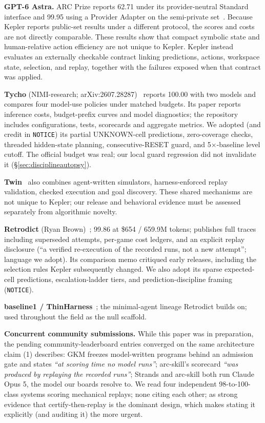 \documentclass[11pt]{article}
\begin{document}
\textbf{GPT-6 Astra.} ARC Prize reports 62.71 under its provider-neutral
Standard interface and 99.95 using a Provider Adapter on the semi-private
set~\citep{arcprize2026astra}. Because Kepler reports public-set results under a
different protocol, the scores and costs are not directly comparable. These
results show that compact symbolic state and human-relative action efficiency
are not unique to Kepler. Kepler instead evaluates an externally checkable
contract linking predictions, actions, workspace state, selection, and replay,
together with the failures exposed when that contract was applied.

\textbf{Tycho} (NIMI-research; arXiv:2607.28287)~\citep{tycho} reports 100.00 with two models and compares four model-use policies under matched budgets. Its paper reports inference costs, budget-prefix curves and model diagnostics; the repository includes configurations, tests, scorecards and aggregate metrics. We adopted (and credit in \texttt{NOTICE}) its partial UNKNOWN-cell predictions, zero-coverage checks, threaded hidden-state planning, consecutive-RESET guard, and 5$\times$-baseline level cutoff. The official budget was real; our local guard regression did not invalidate it (\S\ref{sec:disciplineautopsy}).

\textbf{Twin}~\citep{skoutnev2026twin} also combines agent-written simulators,
harness-enforced replay validation, checked execution and goal discovery.
These shared mechanisms are not unique to Kepler; our release and behavioral
evidence must be assessed separately from algorithmic novelty.

\textbf{Retrodict} (Ryan Brown)~\citep{retrodict}; 99.86 at \$654 / 659.9M tokens; publishes full traces including superseded attempts, per-game cost ledgers, and an explicit replay disclosure (``a verified re-execution of the recorded runs, not a new attempt''; language we adopt). Its comparison memo critiqued early releases, including the selection rules Kepler subsequently changed. We also adopt its sparse expected-cell predictions, escalation-ladder tiers, and prediction-discipline framing (\texttt{NOTICE}).

\textbf{baseline1 / ThinHarness}~\citep{thinharness}; the minimal-agent lineage Retrodict builds on; used throughout the field as the null scaffold.

\textbf{Concurrent community submissions.} While this paper was in preparation, the pending community-leaderboard entries converged on the same architecture claim (1) describes: GKM freezes model-written programs behind an admission gate and states \emph{``at scoring time no model runs''}; arc-skill's scorecard \emph{``was produced by replaying the recorded runs''}; Strands and arc-skill both run Claude Opus 5, the model our boards resolve to. We read four independent 98-to-100-class systems scoring mechanical replays; none citing each other; as strong evidence that certify-then-replay is the dominant design, which makes stating it explicitly (and auditing it) the more urgent.
\end{document}
